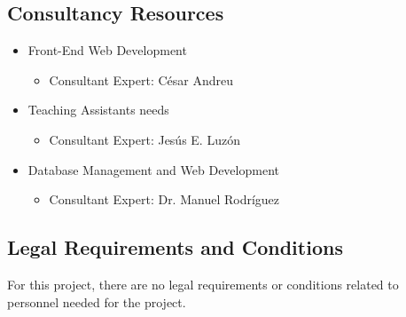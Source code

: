 \subsection{Consultancy Resources}
\begin{itemize}
\item Front-End Web Development
\begin{itemize}
\item Consultant Expert: César Andreu
\end{itemize}
\item Teaching Assistants needs
\begin{itemize}
\item Consultant Expert: Jesús E. Luzón
\end{itemize}
\item Database Management and Web Development
\begin{itemize}
\item Consultant Expert: Dr. Manuel Rodríguez
\end{itemize}
\end{itemize}

\subsection{Legal Requirements and Conditions}
For this project, there are no legal requirements or conditions related to personnel needed for the project.